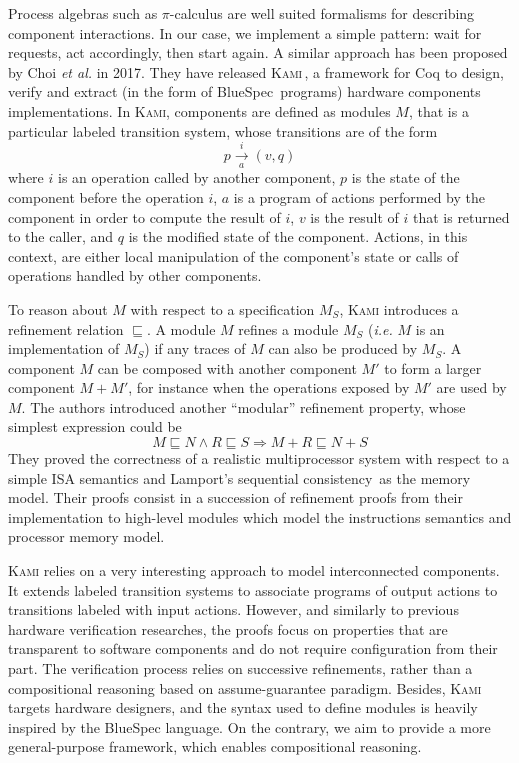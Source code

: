Process algebras such as \( \pi \)-calculus are well suited formalisms for
describing component interactions.
%
In our case, we implement a simple pattern: wait for requests, act accordingly,
then start again.
%
A similar approach has been proposed by Choi \emph{et al.} in 2017.
%
They have released {\scshape Kami}\,\cite{choi2017kami}, a framework for Coq to
design, verify and extract (in the form of BlueSpec\,\cite{nikhil2004bluespec}
programs) hardware components implementations.
%
In {\scshape Kami}, components are defined as modules \( M \), that is a
particular labeled transition system, whose transitions are of the form
%
\[
  p \xrightarrow[a]{i} (v, q)
\]
%
where \( i \) is an operation called by another component, \( p \) is the state
of the component before the operation \( i \), \( a \) is a program of actions
performed by the component in order to compute the result of \( i \), \( v \) is
the result of \( i \) that is returned to the caller, and \( q \) is the
modified state of the component.
%
Actions, in this context, are either local manipulation of the component's state
or calls of operations handled by other components.

To reason about \( M \) with respect to a specification \( M_S \), {\scshape
  Kami} introduces a refinement relation \( \sqsubseteq \).
%
A module \( M \) refines a module \( M_S \) (\emph{i.e.} \( M \) is an
implementation of \( M_S \)) if any traces of \( M \) can also be produced by
\( M_S \).
%
A component \( M \) can be composed with another component \( M' \) to form a
larger component \( M + M' \), for instance when the operations exposed by
\( M' \) are used by \( M \).
%
The authors introduced another ``modular'' refinement property, whose simplest
expression could be
%
\[
  M \sqsubseteq N \wedge R \sqsubseteq S \Rightarrow M + R \sqsubseteq N + S
\]
%
They proved the correctness of a realistic multiprocessor system with respect to
a simple ISA semantics and Lamport's sequential
consistency\,\cite{lamport1979sc} as the memory model.
%
Their proofs consist in a succession of refinement proofs from their
implementation to high-level modules which model the instructions semantics and
processor memory model.

{\scshape Kami} relies on a very interesting approach to model interconnected
components.
%
It extends labeled transition systems to associate programs of output actions to
transitions labeled with input actions.
%
However, and similarly to previous hardware verification researches, the proofs
focus on properties that are transparent to software components and do not
require configuration from their part.
%
The verification process relies on successive refinements, rather than a
compositional reasoning based on assume-guarantee paradigm. 
%
Besides, {\scshape Kami} targets hardware designers, and the syntax used to
define modules is heavily inspired by the BlueSpec language.
%
On the contrary, we aim to provide a more general-purpose framework, which
enables compositional reasoning.

